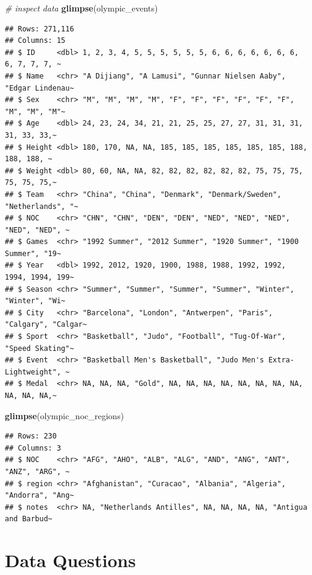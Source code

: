 \documentclass[
]{book}
\newenvironment{Shaded}{\begin{snugshade}}{\end{snugshade}}
\newcommand{\CommentTok}[1]{\textcolor[rgb]{0.56,0.35,0.01}{\textit{#1}}}
\newcommand{\KeywordTok}[1]{\textcolor[rgb]{0.13,0.29,0.53}{\textbf{#1}}}
\newcommand{\NormalTok}[1]{#1}
\begin{document}
\begin{Shaded}
\begin{Highlighting}[]
\CommentTok{# inspect data }
\KeywordTok{glimpse}\NormalTok{(olympic_events)}
\end{Highlighting}
\end{Shaded}

\begin{verbatim}
## Rows: 271,116
## Columns: 15
## $ ID     <dbl> 1, 2, 3, 4, 5, 5, 5, 5, 5, 5, 6, 6, 6, 6, 6, 6, 6, 6, 7, 7, 7, ~
## $ Name   <chr> "A Dijiang", "A Lamusi", "Gunnar Nielsen Aaby", "Edgar Lindenau~
## $ Sex    <chr> "M", "M", "M", "M", "F", "F", "F", "F", "F", "F", "M", "M", "M"~
## $ Age    <dbl> 24, 23, 24, 34, 21, 21, 25, 25, 27, 27, 31, 31, 31, 31, 33, 33,~
## $ Height <dbl> 180, 170, NA, NA, 185, 185, 185, 185, 185, 185, 188, 188, 188, ~
## $ Weight <dbl> 80, 60, NA, NA, 82, 82, 82, 82, 82, 82, 75, 75, 75, 75, 75, 75,~
## $ Team   <chr> "China", "China", "Denmark", "Denmark/Sweden", "Netherlands", "~
## $ NOC    <chr> "CHN", "CHN", "DEN", "DEN", "NED", "NED", "NED", "NED", "NED", ~
## $ Games  <chr> "1992 Summer", "2012 Summer", "1920 Summer", "1900 Summer", "19~
## $ Year   <dbl> 1992, 2012, 1920, 1900, 1988, 1988, 1992, 1992, 1994, 1994, 199~
## $ Season <chr> "Summer", "Summer", "Summer", "Summer", "Winter", "Winter", "Wi~
## $ City   <chr> "Barcelona", "London", "Antwerpen", "Paris", "Calgary", "Calgar~
## $ Sport  <chr> "Basketball", "Judo", "Football", "Tug-Of-War", "Speed Skating"~
## $ Event  <chr> "Basketball Men's Basketball", "Judo Men's Extra-Lightweight", ~
## $ Medal  <chr> NA, NA, NA, "Gold", NA, NA, NA, NA, NA, NA, NA, NA, NA, NA, NA,~
\end{verbatim}

\begin{Shaded}
\begin{Highlighting}[]
\KeywordTok{glimpse}\NormalTok{(olympic_noc_regions)}
\end{Highlighting}
\end{Shaded}

\begin{verbatim}
## Rows: 230
## Columns: 3
## $ NOC    <chr> "AFG", "AHO", "ALB", "ALG", "AND", "ANG", "ANT", "ANZ", "ARG", ~
## $ region <chr> "Afghanistan", "Curacao", "Albania", "Algeria", "Andorra", "Ang~
## $ notes  <chr> NA, "Netherlands Antilles", NA, NA, NA, NA, "Antigua and Barbud~
\end{verbatim}

\hypertarget{data-questions}{%
\section{Data Questions}\label{data-questions}}
\end{document}
